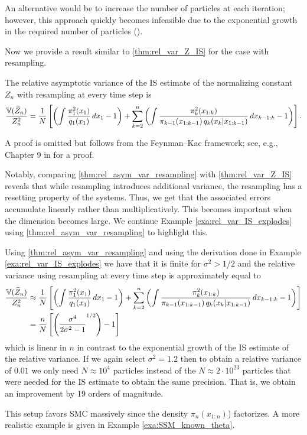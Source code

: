 An alternative would be to increase the number of particles at each iteration; however, this approach quickly becomes infeasible due to the exponential growth in the required number of particles (\cite{Doucet}).

Now we provide a result similar to \cref{thm:rel_var_Z_IS} for the case with resampling. 

\begin{theorem}
	\label{thm:rel_asym_var_resampling}
	The relative asymptotic variance of the \gls*{IS} estimate of the normalizing constant \(Z_n\) with resampling at every time step is
	\[
	\frac{\operatorname{\mathbb{V}}(\widetilde{Z}_n)}{Z_n^2}=\frac{1}{N}\left[\left(\int 	\frac{\pi_1^2(x_1)}{q_1(x_1)}\,dx_1-1\right)+\sum_{k=2}^n\left(\int \frac{\pi_k^2(x_{1:k})}{\pi_{k-1}(x_{1:k-1})\,q_k(x_k\vert x_{1:k-1})}\,dx_{k-1:k}-1\right)\right].
	\]
\end{theorem}
A proof is omitted but follows from the Feynman–Kac framework; see, e.g., Chapter 9 in \cite{moral2004feynman} for a proof.

Notably, comparing \cref{thm:rel_asym_var_resampling} with \cref{thm:rel_var_Z_IS} reveals that while resampling introduces additional variance, the resampling has a resetting property of the systems. Thus, we get that the associated errors accumulate linearly rather than multiplicatively. This becomes important when the dimension becomes large. We continue Example \ref{exa:rel_var_IS_explodes} using \cref{thm:rel_asym_var_resampling} to highlight this.
\begin{example}
	\label{exa:rel_var_IS_explodes_cont}
	Using \cref{thm:rel_asym_var_resampling} and using the derivation done in Example \ref{exa:rel_var_IS_explodes} we have that it is finite for $\sigma^2>1/2$ and the relative variance using resampling at every time step is approximately equal to
	\begin{align*}
		\frac{\operatorname{\mathbb{V}}(\widetilde{Z}_n)}{Z_n^2}&\approx\frac{1}{N}\left[\left(\int 	\frac{\pi_1^2(x_1)}{q_1(x_1)}\,dx_1-1\right)+\sum_{k=2}^n\left(\int \frac{\pi_k^2(x_{1:k})}{\pi_{k-1}(x_{1:k-1})\,q_k(x_k\vert x_{1:k-1})}\,dx_{k-1:k}-1\right)\right] \\
		&=\frac{n}{N}\left[\left(\frac{\sigma^4}{2\sigma^2-1}^{1/2}\right)-1\right]
	\end{align*}
	which is linear in $n$ in contrast to the exponential growth of the \gls*{IS} estimate of the relative variance. If we again select $\sigma^2=1.2$ then to obtain a relative variance of $0.01$ we only need $N\approx 10^4$ particles instead of the $N\approx 2\cdot 10^{23}$ particles that were needed for the IS estimate to obtain the same precision. That is, we obtain an improvement by 19 orders of magnitude.
\end{example} 
This setup favors SMC massively since the density $\pi_n(x_{1:n})$) factorizes. A more realistic example is given in Example \ref{exa:SSM_known_theta}.

